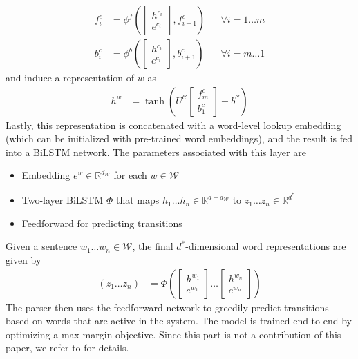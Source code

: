 \documentclass[11pt,letterpaper]{article}
\newcommand{\R}{\ensuremath{\mathbb{R}}}
\newcommand{\paren}[1]{\left(#1\right)}
\begin{document}
\begin{CJK}{UTF8}{gbsn}
\begin{align*}
f^c_i &= \phi^f\paren{ \begin{bmatrix}h^{c_i} \\ e^{c_i} \end{bmatrix}, f^c_{i-1} } &&\forall i=1\ldots m \\
b^c_i &= \phi^b\paren{ \begin{bmatrix}h^{c_i}  \\ e^{c_i} \end{bmatrix}, b^c_{i+1} } &&\forall i=m\ldots 1
\end{align*}
and induce a representation of $w$ as
\begin{align*}
h^w &= \tanh{\paren{U^{\mathcal{C}} \begin{bmatrix}f^c_m\\ b^c_1 \end{bmatrix} + b^{\mathcal{C}}}}
\end{align*}
Lastly, this representation is concatenated with a word-level lookup embedding (which can be initialized with pre-trained word embeddings),
and the result is fed into a BiLSTM network.
The parameters associated with this layer are
\begin{itemize}
\item Embedding $e^w \in \R^{d_{\mathcal{W}}}$ for each $w \in \mathcal{W}$
\item Two-layer BiLSTM $\Phi$ that maps $h_1 \ldots h_n \in \R^{d + d_{\mathcal{W}}}$ to $z_1 \ldots z_n \in \R^{d^*}$
\item Feedforward for predicting transitions
\end{itemize}
Given a sentence $w_1 \ldots w_n \in \mathcal{W}$, the final $d^*$-dimensional word representations are given by
\begin{align*}
(z_1 \ldots z_n) &= \Phi\paren{\begin{bmatrix}h^{w_1}\\ e^{w_1} \end{bmatrix} \ldots \begin{bmatrix}h^{w_n}\\ e^{w_n} \end{bmatrix}}
\end{align*}
The parser then uses the feedforward network to greedily predict transitions based on words that are active in the system.
The model is trained end-to-end by optimizing a max-margin objective.
Since this part is not a contribution of this paper, we refer to  for details.


\end{CJK}
\end{document}
